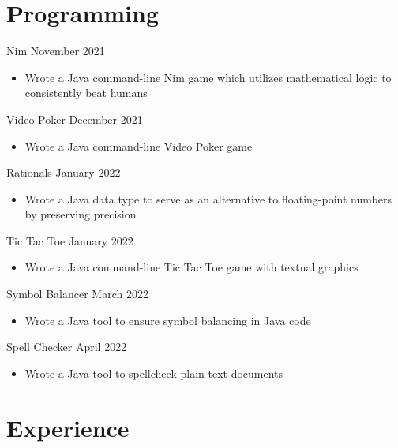 \documentclass[10pt]{article}
\begin{document}
\section*{Programming}
    Nim \hfill November 2021
    \begin{itemize}
        \item Wrote a Java command-line Nim game which utilizes mathematical logic to consistently beat humans
    \end{itemize}

    Video Poker \hfill December 2021
    \begin{itemize}
        \item Wrote a Java command-line Video Poker game
    \end{itemize}

    Rationals \hfill January 2022
    \begin{itemize}
        \item Wrote a Java data type to serve as an alternative to floating-point numbers by preserving precision
    \end{itemize}

    Tic Tac Toe \hfill January 2022
    \begin{itemize}
        \item Wrote a Java command-line Tic Tac Toe game with textual graphics
    \end{itemize}

    Symbol Balancer \hfill March 2022
    \begin{itemize}
        \item Wrote a Java tool to ensure symbol balancing in Java code
    \end{itemize}

    Spell Checker \hfill April 2022
    \begin{itemize}
        \item Wrote a Java tool to spellcheck plain-text documents
    \end{itemize}


\section*{Experience}   
\end{document}
